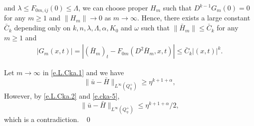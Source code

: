 \documentclass[preprint,12pt]{elsarticle}
\theoremstyle{definition}
\theoremstyle{remark}
\numberwithin{equation}{section}
\begin{document}
and $\lambda\leq F_{0m,ij}(0)\leq \Lambda$, we can choose proper $H_m$ such that $D^{k-1}G_m(0)=0$ for any $m\geq 1$ and $\|H_m\|\rightarrow 0$ as $m\rightarrow \infty$. Hence, there exists a large constant $\bar C_k$ depending only on $k,n,\lambda, \Lambda,\alpha,K_0$ and $\omega$ such that $\|\bar{H}_m\|\leq \bar C_k$ for any $m\geq 1$ and
\begin{equation*}
  \begin{aligned}
|G_m(x,t)|=|(\bar{H}_m)_t-F_{0m}(D^2\bar{H}_m,x,t)|\leq \bar C_k|(x,t)|^{k}.
  \end{aligned}
\end{equation*}

Let $m\rightarrow \infty$ in \cref{e.L.Cka.1} and we have
\begin{equation*}
    \|\bar u-\bar{H}\|_{L^{\infty}(Q_{\eta}^+)}\geq \eta^{k+1+\alpha},
\end{equation*}
However, by \cref{e.L.Cka.2} and \cref{e.cka-5},
\begin{equation*}
  \|\bar u-\bar{H}\|_{L^{\infty}(Q_{\eta}^+)}\leq \eta^{k+1+\alpha}/2,
\end{equation*}
which is a contradiction.  ~\qed~\\
\end{document}
